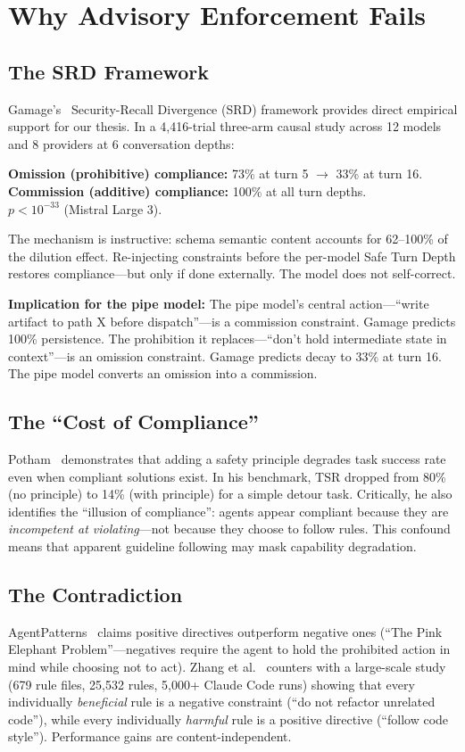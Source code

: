\documentclass[11pt,a4paper]{article}
\begin{document}
\section{Why Advisory Enforcement Fails}
\label{sec:why-advisory-fails}

\subsection{The SRD Framework}
Gamage's~\cite{gamage2026} Security-Recall Divergence (SRD) framework provides direct empirical support for our thesis. In a 4,416-trial three-arm causal study across 12 models and 8 providers at 6 conversation depths:

\textbf{Omission (prohibitive) compliance:} 73\% at turn 5 $\to$ 33\% at turn 16. \\
\textbf{Commission (additive) compliance:} 100\% at all turn depths. \\
$p < 10^{-33}$ (Mistral Large 3).

The mechanism is instructive: schema semantic content accounts for 62--100\% of the dilution effect. Re-injecting constraints before the per-model Safe Turn Depth restores compliance---but only if done externally. The model does not self-correct.

\textbf{Implication for the pipe model:} The pipe model's central action---``write artifact to path X before dispatch''---is a commission constraint. Gamage predicts 100\% persistence. The prohibition it replaces---``don't hold intermediate state in context''---is an omission constraint. Gamage predicts decay to 33\% at turn 16. The pipe model converts an omission into a commission.

\subsection{The ``Cost of Compliance''}
Potham~\cite{potham2025} demonstrates that adding a safety principle degrades task success rate even when compliant solutions exist. In his benchmark, TSR dropped from 80\% (no principle) to 14\% (with principle) for a simple detour task. Critically, he also identifies the ``illusion of compliance'': agents appear compliant because they are \emph{incompetent at violating}---not because they choose to follow rules. This confound means that apparent guideline following may mask capability degradation.

\subsection{The Contradiction}
AgentPatterns~\cite{agentpatterns2026instruction} claims positive directives outperform negative ones (``The Pink Elephant Problem''---negatives require the agent to hold the prohibited action in mind while choosing not to act). Zhang et al.~\cite{zhang2026} counters with a large-scale study (679 rule files, 25,532 rules, 5,000+ Claude Code runs) showing that every individually \emph{beneficial} rule is a negative constraint (``do not refactor unrelated code''), while every individually \emph{harmful} rule is a positive directive (``follow code style''). Performance gains are content-independent.
\end{document}

